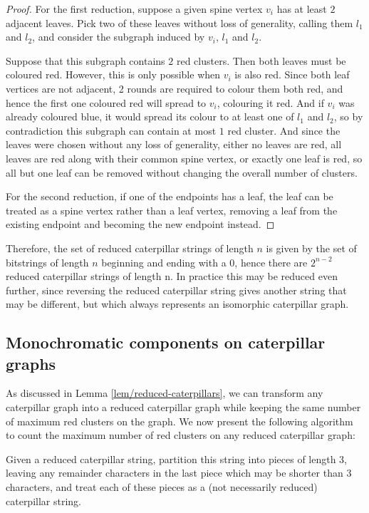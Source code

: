 \documentclass{mpaper}
\begin{document}
\begin{proof}

For the first reduction, suppose a given spine vertex $v_i$ has at least $2$ adjacent leaves. Pick two of these leaves without loss of generality, calling them $l_1$ and $l_2$, and consider the subgraph induced by $v_i$, $l_1$ and $l_2$.

Suppose that this subgraph contains $2$ red clusters. Then both leaves must be coloured red. However, this is only possible when $v_i$ is also red. Since both leaf vertices are not adjacent, 2 rounds are required to colour them both red, and hence the first one coloured red will spread to $v_i$, colouring it red. And if $v_i$ was already coloured blue, it would spread its colour to at least one of $l_1$ and $l_2$, so by contradiction this subgraph can contain at most $1$ red cluster. And since the leaves were chosen without any loss of generality, either no leaves are red, all leaves are red along with their common spine vertex, or exactly one leaf is red, so all but one leaf can be removed without changing the overall number of clusters.

For the second reduction, if one of the endpoints has a leaf, the leaf can be treated as a spine vertex rather than a leaf vertex, removing a leaf from the existing endpoint and becoming the new endpoint instead.
\end{proof}

Therefore, the set of reduced caterpillar strings of length $n$ is given by the set of bitstrings of length $n$ beginning and ending with a $0$, hence there are $2^{n-2}$ reduced caterpillar strings of length n. In practice this may be reduced even further, since reversing the reduced caterpillar string gives another string that may be different, but which always represents an isomorphic caterpillar graph.

\subsection{Monochromatic components on caterpillar graphs}

As discussed in Lemma \ref{lem/reduced-caterpillars}, we can transform any caterpillar graph into a reduced caterpillar graph while keeping the same number of maximum red clusters on the graph. We now present the following algorithm to count the maximum number of red clusters on any reduced caterpillar graph:

Given a reduced caterpillar string, partition this string into pieces of length 3, leaving any remainder characters in the last piece which may be shorter than 3 characters, and treat each of these pieces as a (not necessarily reduced) caterpillar string.
\end{document}
